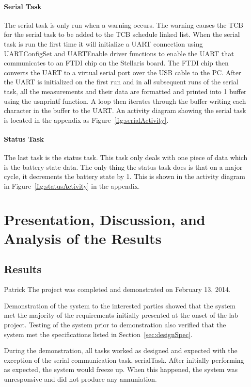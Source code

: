 \documentclass[12pt]{article} %
\begin{document}
    \paragraph{Serial Task} The serial task is only run when a warning occurs.
    The warning causes the TCB for the serial task to be added to the TCB
    schedule linked list. When the serial task is run the first time it will
    initialize a UART connection using UARTConfigSet and UARTEnable driver
    functions to enable the UART that communicates to an FTDI chip on the
    Stellaris board. The FTDI chip then converts the UART to a virtual serial
    port over the USB cable to the PC. After the UART is initialized on the
    first run and in all subsequent runs of the serial task, all the
    measurements and their data are formatted and printed into 1 buffer using
    the usnprintf function. A loop then iterates through the buffer writing
    each character in the buffer to the UART. An activity diagram showing the
    serial task is located in the appendix as Figure~\ref{fig:serialActivity}.
    
    \paragraph{Status Task}
    The last task is the status task. This task only deals with one piece of data
    which is the battery state data. The only thing the status task does is that on
    a major cycle, it decrements the battery state by 1. This is shown in the
    activity diagram in Figure~\ref{fig:statusActivity} in the appendix.

    \section{Presentation, Discussion, and Analysis of the Results}

    \subsection{Results} Patrick
    The project was completed and demonstrated on February 13, 2014.

    Demonstration of the system to the interested parties showed that the
    system met the majority of the requirements initially presented at the onset of the lab
    project.  Testing of the system prior to demonstration also verified that
    the system met the specifications listed in Section~\ref{sec:designSpec}.

    During the demonstration, all tasks worked as designed and expected with
    the exception of the serial communication task, serialTask. After initially
    performing as expected, the system would freeze up. When this happened, the
    system was unresponsive and did not produce any annuniation.
\end{document}
